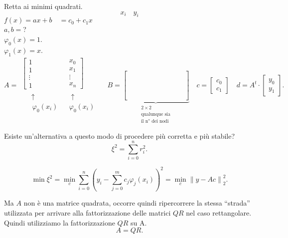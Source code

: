 \begin{exe}Retta ai minimi quadrati.
\[x_i\quad y_i\]
$f(x) = ax +b \quad = c_0 + c_1x$\\
$a, b =$? \\
$\varphi_0(x) = 1$.\\
$\varphi_1(x) = x$. \\
\[
A = \begin{array}{cc}
\left[\begin{array}{c}1 \\ 1 \\ \vdots \\ 1\end{array}\right.
&
\left.\begin{array}{c}x_0\\x_1\\\vdots\\x_n\end{array}\right]
\\
\substack{\phantom{A}\uparrow \\\phantom{Ab}\varphi_0(x_i)}
& \substack{\uparrow\phantom{Ab} \\\phantom{}\varphi_0(x_i)}
\end{array} \quad
B = \underbrace{
\left[\begin{array}{cc}\phantom{\varphi_0(x)} & \phantom{\varphi_0(x)}\\\\
\\
\phantom{\varphi_0(x)} & \phantom{\varphi_0(x)}
\end{array}\right]}_{\substack{2 \times 2 \\ \textrm{qualunque sia} \\ \textrm{il n° dei
nodi}}} \quad c =
\left[\begin{array}{c}c_0\\c_1\end{array}\right]\quad
d = A^t \cdot \left[\begin{array}{c}y_0\\y_1\end{array}\right].
\]
\end{exe}

Esiste un'alternativa a questo modo di procedere più corretta e più stabile?
\[
\xi^2 = \sum_{i=0}^nr_i^2.
\]

\[
\min \xi^2 =
\min_c \sum_{i=0}^n\left(y_i - \sum_{j=0}^mc_j\varphi_j(x_i)\right)^2 =
\min_c \left\|y - Ac \right\|_2^2.
\]

Ma $A$ non è una matrice quadrata, occorre quindi ripercorrere la stessa
``strada'' utilizzata per arrivare alla fattorizzazione delle matrici $QR$
nel caso rettangolare. Quindi utilizziamo la fattorizzazione $QR$ su A.
\[A = QR.\]

